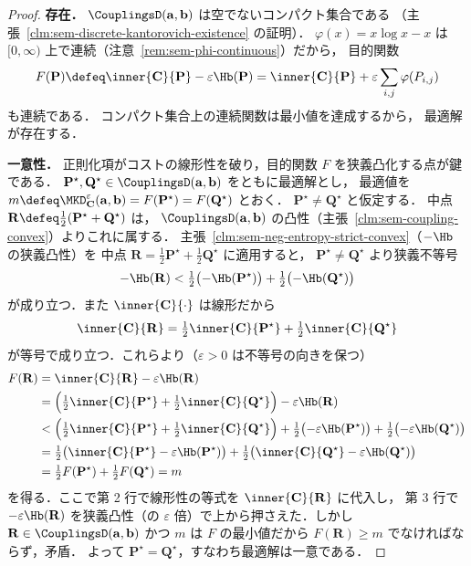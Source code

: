 \begin{proof}
  \textbf{存在．}
  $\CouplingsD(\mathbf{a}, \mathbf{b})$ は空でないコンパクト集合である
  （主張~\ref{clm:sem-discrete-kantorovich-existence} の証明）．
  $\varphi(x) = x\log x - x$ は $[0,\infty)$ 上で連続（注意~\ref{rem:sem-phi-continuous}）だから，
  目的関数
  \[
    F(\mathbf{P})
    \defeq
    \inner{\mathbf{C}}{\mathbf{P}} - \varepsilon \Hb(\mathbf{P})
    =
    \inner{\mathbf{C}}{\mathbf{P}}
    + \varepsilon \sum_{i,j} \varphi(P_{i,j})
  \]
  も連続である．
  コンパクト集合上の連続関数は最小値を達成するから，
  最適解が存在する．

  \textbf{一意性．}
  正則化項がコストの線形性を破り，目的関数 $F$ を狭義凸化する点が鍵である．
  $\mathbf{P}^\star, \mathbf{Q}^\star \in \CouplingsD(\mathbf{a}, \mathbf{b})$ をともに最適解とし，
  最適値を $m \defeq \MKD_{\mathbf{C}}^\varepsilon(\mathbf{a}, \mathbf{b}) = F(\mathbf{P}^\star) = F(\mathbf{Q}^\star)$ とおく．
  $\mathbf{P}^\star \neq \mathbf{Q}^\star$ と仮定する．
  中点 $\mathbf{R} \defeq \tfrac{1}{2}(\mathbf{P}^\star + \mathbf{Q}^\star)$ は，
  $\CouplingsD(\mathbf{a}, \mathbf{b})$ の凸性（主張~\ref{clm:sem-coupling-convex}）よりこれに属する．
  主張~\ref{clm:sem-neg-entropy-strict-convex}（$-\Hb$ の狭義凸性）を
  中点 $\mathbf{R} = \tfrac{1}{2}\mathbf{P}^\star + \tfrac{1}{2}\mathbf{Q}^\star$ に適用すると，
  $\mathbf{P}^\star \neq \mathbf{Q}^\star$ より狭義不等号
  \[
    -\Hb(\mathbf{R})
    < \tfrac{1}{2}\bigl(-\Hb(\mathbf{P}^\star)\bigr) + \tfrac{1}{2}\bigl(-\Hb(\mathbf{Q}^\star)\bigr)
  \]
  が成り立つ．また $\inner{\mathbf{C}}{\cdot}$ は線形だから
  \[
    \inner{\mathbf{C}}{\mathbf{R}}
    = \tfrac{1}{2}\inner{\mathbf{C}}{\mathbf{P}^\star} + \tfrac{1}{2}\inner{\mathbf{C}}{\mathbf{Q}^\star}
  \]
  が等号で成り立つ．これらより（$\varepsilon > 0$ は不等号の向きを保つ）
  \begin{align*}
    F(\mathbf{R})
    &= \inner{\mathbf{C}}{\mathbf{R}} - \varepsilon\Hb(\mathbf{R}) \\
    &= \Bigl(\tfrac{1}{2}\inner{\mathbf{C}}{\mathbf{P}^\star} + \tfrac{1}{2}\inner{\mathbf{C}}{\mathbf{Q}^\star}\Bigr)
       - \varepsilon\Hb(\mathbf{R}) \\
    &< \Bigl(\tfrac{1}{2}\inner{\mathbf{C}}{\mathbf{P}^\star} + \tfrac{1}{2}\inner{\mathbf{C}}{\mathbf{Q}^\star}\Bigr)
       + \tfrac{1}{2}\bigl(-\varepsilon\Hb(\mathbf{P}^\star)\bigr)
       + \tfrac{1}{2}\bigl(-\varepsilon\Hb(\mathbf{Q}^\star)\bigr) \\
    &= \tfrac{1}{2}\bigl(\inner{\mathbf{C}}{\mathbf{P}^\star} - \varepsilon\Hb(\mathbf{P}^\star)\bigr)
       + \tfrac{1}{2}\bigl(\inner{\mathbf{C}}{\mathbf{Q}^\star} - \varepsilon\Hb(\mathbf{Q}^\star)\bigr) \\
    &= \tfrac{1}{2}F(\mathbf{P}^\star) + \tfrac{1}{2}F(\mathbf{Q}^\star) = m
  \end{align*}
  を得る．ここで第 2 行で線形性の等式を $\inner{\mathbf{C}}{\mathbf{R}}$ に代入し，
  第 3 行で $-\varepsilon\Hb(\mathbf{R})$ を狭義凸性（の $\varepsilon$ 倍）で上から押さえた．しかし $\mathbf{R} \in \CouplingsD(\mathbf{a}, \mathbf{b})$ かつ $m$ は $F$ の最小値だから
  $F(\mathbf{R}) \geq m$ でなければならず，矛盾．
  よって $\mathbf{P}^\star = \mathbf{Q}^\star$，すなわち最適解は一意である．
\end{proof}

